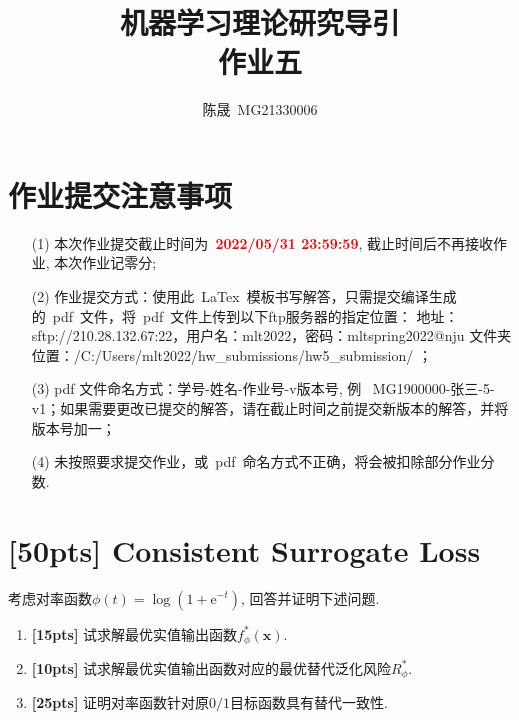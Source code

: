 \documentclass[a4paper,UTF8]{article}
\numberwithin{equation}{section}
\begin{document}
	
	\title{机器学习理论研究导引\\
		作业五}
	\author{陈晟\, MG21330006} 
	\maketitle
	
	\section*{作业提交注意事项}
	
	\begin{tcolorbox}
		\begin{enumerate}
			\item[(1)] 本次作业提交截止时间为~\textcolor{red}{\textbf{2022/05/31  23:59:59}}, 截止时间后不再接收作业, 本次作业记零分; 
			\item[(2)] 作业提交方式：使用此~LaTex~模板书写解答，只需提交编译生成的~pdf~文件，将~pdf~文件上传到以下ftp服务器的指定位置：
			\newline 地址：sftp://210.28.132.67:22，用户名：mlt2022，密码：mltspring2022@nju
			\newline 文件夹位置：/C:/Users/mlt2022/hw\_submissions/hw5\_submission/  ；
			\item[(3)] pdf 文件命名方式：学号-姓名-作业号-v版本号, 例~ MG1900000-张三-5-v1；如果需要更改已提交的解答，请在截止时间之前提交新版本的解答，并将版本号加一；
			\item[(4)] 未按照要求提交作业，或~pdf~命名方式不正确，将会被扣除部分作业分数. 
		\end{enumerate}
	\end{tcolorbox}
	
	\newpage
	
	\section{[50pts] Consistent Surrogate Loss}
	
	\noindent 考虑对率函数$\phi(t) = \log \left( 1 + \mathrm{e}^{-t} \right)$, 回答并证明下述问题. 
	\begin{enumerate}
		\item \textbf{[15pts]} 试求解最优实值输出函数$f_\phi^*(\bm{x})$. 
		\item \textbf{[10pts]} 试求解最优实值输出函数对应的最优替代泛化风险$R_\phi^*$. 
		\item \textbf{[25pts]} 证明对率函数针对原$0/1$目标函数具有替代一致性. 
	\end{enumerate}
	
\end{document}
